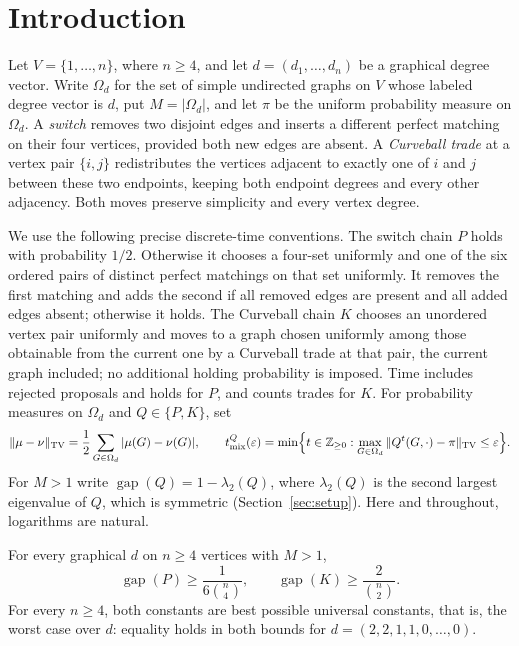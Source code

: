 \section{Introduction}\label{sec:introduction}
Let $V=\{1,\ldots,n\}$, where $n\ge4$, and let $d=(d_1,\ldots,d_n)$ be a
graphical degree vector. Write $\Omega_d$ for the set of simple undirected
graphs on $V$ whose labeled degree vector is $d$, put $M=|\Omega_d|$, and let
$\pi$ be the uniform probability measure on $\Omega_d$. A \emph{switch}
removes two disjoint edges and inserts a different perfect matching on their
four vertices, provided both new edges are absent. A \emph{Curveball trade} at
a vertex pair $\{i,j\}$ redistributes the vertices adjacent to exactly one of
$i$ and $j$ between these two endpoints, keeping both endpoint degrees and
every other adjacency. Both moves preserve simplicity and every vertex degree.

We use the following precise discrete-time conventions. The switch chain $P$
holds with probability $1/2$. Otherwise it chooses a four-set uniformly and one
of the six ordered pairs of distinct perfect matchings on that set uniformly.
It removes the first matching and adds the second if all removed edges are
present and all added edges absent; otherwise it holds. The Curveball chain
$K$ chooses an unordered vertex pair uniformly and moves to a graph chosen
uniformly among those obtainable from the current one by a Curveball trade at
that pair, the current graph included; no additional holding probability is
imposed. Time
includes rejected proposals and holds for $P$, and counts trades for $K$. For
probability measures on $\Omega_d$ and $Q\in\{P,K\}$, set
\[
 \|\mu-\nu\|_{\mathrm{TV}}
 =\frac12\sum_{G\in\Omega_d}|\mu(G)-\nu(G)|,
 \qquad
 t_{\mathrm{mix}}^Q(\varepsilon)
 =\min\Bigl\{t\in\mathbb Z_{\ge0}:
 \max_{G\in\Omega_d}\|Q^t(G,\cdot)-\pi\|_{\mathrm{TV}}\le\varepsilon\Bigr\}.
\]
For $M>1$ write $\operatorname{gap}(Q)=1-\lambda_2(Q)$, where $\lambda_2(Q)$ is
the second largest eigenvalue of $Q$, which is symmetric
(Section~\ref{sec:setup}). Here and throughout, logarithms are
natural.

\begin{theorem}\label{thm:main}
For every graphical $d$ on $n\ge4$ vertices with $M>1$,
\begin{equation}\label{eq:gaps}
 \operatorname{gap}(P)\ge\frac{1}{6\binom n4},\qquad
 \operatorname{gap}(K)\ge\frac{2}{\binom n2}.
\end{equation}
For every $n\ge4$, both constants are best possible universal constants,
that is, the worst case over $d$: equality holds in both bounds for
$d=(2,2,1,1,0,\ldots,0)$.
\end{theorem}

